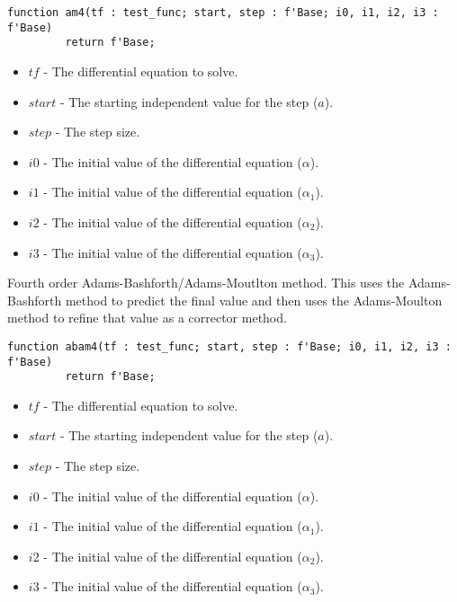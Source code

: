 \documentclass[10pt, openany]{book}
\begin{document}
\begin{lstlisting}
function am4(tf : test_func; start, step : f'Base; i0, i1, i2, i3 : f'Base)
         return f'Base;
\end{lstlisting}
\begin{itemize}
  \item $tf$ - The differential equation to solve.
  \item $start$ - The starting independent value for the step ($a$).
  \item $step$ - The step size.
  \item $i0$ - The initial value of the differential equation ($\alpha$).
  \item $i1$ - The initial value of the differential equation ($\alpha_1$).
  \item $i2$ - The initial value of the differential equation ($\alpha_2$).
  \item $i3$ - The initial value of the differential equation ($\alpha_3$).
\end{itemize}

Fourth order Adams-Bashforth/Adams-Moutlton method.  This uses the Adams-Bashforth method to predict the final value and then uses the Adams-Moulton method to refine that value as a corrector method.

\begin{lstlisting}
function abam4(tf : test_func; start, step : f'Base; i0, i1, i2, i3 : f'Base)
         return f'Base;
\end{lstlisting}
\begin{itemize}
  \item $tf$ - The differential equation to solve.
  \item $start$ - The starting independent value for the step ($a$).
  \item $step$ - The step size.
  \item $i0$ - The initial value of the differential equation ($\alpha$).
  \item $i1$ - The initial value of the differential equation ($\alpha_1$).
  \item $i2$ - The initial value of the differential equation ($\alpha_2$).
  \item $i3$ - The initial value of the differential equation ($\alpha_3$).
\end{itemize}
\end{document}
